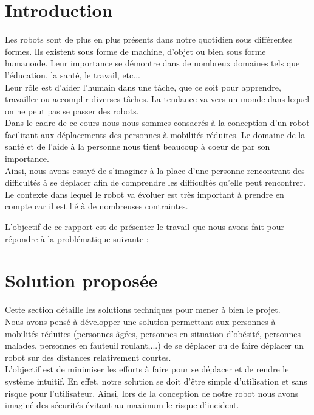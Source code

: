 \chapter{Introduction}
Les robots sont de plus en plus présents dans notre quotidien sous différentes formes. Ils existent sous forme de machine, d'objet ou bien sous forme humanoïde. 
Leur importance se démontre dans de nombreux domaines tels que l'éducation, la santé, le travail, etc... \\
Leur rôle est d'aider l'humain dans une tâche, que ce soit pour apprendre, travailler ou accomplir diverses tâches.  La tendance va vers un monde dans lequel on ne peut pas se passer des robots. \\

Dans le cadre de ce cours nous nous sommes consacrés à la conception d'un robot facilitant aux déplacements des personnes à mobilités réduites. Le domaine de la santé et de l'aide à la personne nous tient beaucoup à coeur de par son importance. \\

Ainsi, nous avons essayé de s'imaginer à la place d'une personne rencontrant des difficultés à se déplacer afin de comprendre les difficultés qu'elle peut rencontrer. Le contexte dans lequel le robot va évoluer est très important à prendre en compte car il est lié à de nombreuses contraintes. 

L'objectif de ce rapport est de présenter le travail que nous avons fait pour répondre à la problématique suivante : \\




\chapter{Solution proposée}

Cette section détaille les solutions techniques pour mener à bien le projet.\\

Nous avons pensé à développer une solution permettant aux personnes à mobilités réduites (personnes âgées, personnes en situation d'obésité, personnes malades, personnes en fauteuil roulant,...) de se déplacer ou de faire déplacer un robot sur des distances relativement courtes. \\
L'objectif est de minimiser les efforts à faire pour se déplacer et de rendre le système intuitif. En effet, notre solution se doit d'être simple d'utilisation et sans risque pour l'utilisateur. Ainsi, lors de la conception de notre robot nous avons imaginé des sécurités évitant au maximum le risque d'incident. \\

